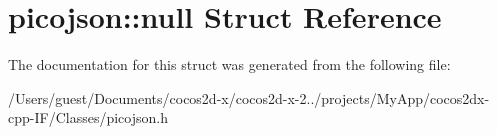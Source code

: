 \hypertarget{structpicojson_1_1null}{\section{picojson\-:\-:null Struct Reference}
\label{structpicojson_1_1null}
}


The documentation for this struct was generated from the following file\-:\begin{DoxyCompactItemize}
\item 
/\-Users/guest/\-Documents/cocos2d-\/x/cocos2d-\/x-\/2../projects/\-My\-App/cocos2dx-\/cpp-\/\-I\-F/\-Classes/picojson.\-h\end{DoxyCompactItemize}
